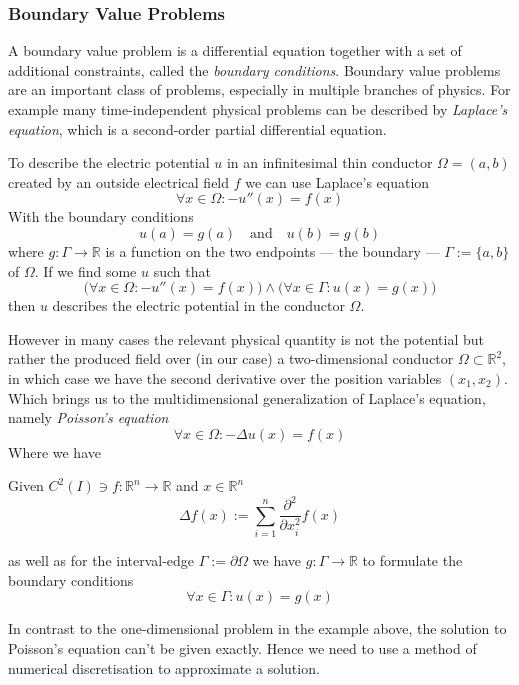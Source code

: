 \subsubsection{Boundary Value Problems}
A boundary value problem is a differential equation together with a set of additional constraints, called the \emph{boundary conditions}.
Boundary value problems are an important class of problems, especially in multiple branches of physics.
For example many time-independent physical problems can be described by \emph{Laplace's equation}, which is a second-order partial differential equation.
\begin{example}
   To describe the electric potential \(u\) in an infinitesimal thin conductor \(\Omega = (a, b)\) created by an outside electrical field \(f\) we can use Laplace's equation
   \[\forall x \in \Omega: -u''(x) = f(x)\]
   With the boundary conditions
   \[u(a) = g(a) \quad\text{and}\quad u(b) = g(b)\]
   where \(g: \Gamma \to \mathbb{R}\) is a function on the two endpoints --- the boundary --- \(\Gamma := \{a, b\}\) of \(\Omega\).
   If we find some \(u\) such that
   \[\big(\forall x \in \Omega: -u''(x) = f(x)\big) \land \big(\forall x \in \Gamma: u(x) = g(x)\big)\]
   then \(u\) describes the electric potential in the conductor \(\Omega\).
\end{example}
However in many cases the relevant physical quantity is not the potential but rather the produced field over (in our case) a two-dimensional conductor \(\Omega \subset \mathbb{R}^2\), in which case we have the second derivative over the position variables \((x_1, x_2)\).
Which brings us to the multidimensional generalization of Laplace's equation, namely \emph{Poisson's equation}
\[\forall x \in \Omega: -\Delta u(x) = f(x)\]
Where we have
\begin{definition}
   Given \(C^2(I) \ni f: \mathbb{R}^n \to \mathbb{R}\) and \(x \in \mathbb{R}^n\)
   \[\Delta f(x) := \sum_{i = 1}^n \frac{\partial^2}{\partial x_i^2} f(x)\]
\end{definition}
as well as for the interval-edge \(\Gamma := \partial \Omega\) we have \(g: \Gamma \to \mathbb{R}\) to formulate the boundary conditions
\[\forall x \in \Gamma: u(x) = g(x)\]

In contrast to the one-dimensional problem in the example above, the solution to Poisson's equation can't be given exactly.
Hence we need to use a method of numerical discretisation to approximate a solution.

